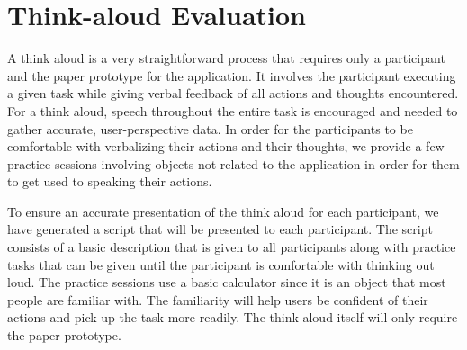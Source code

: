 \documentclass[pdftex,12pt,a4paper]{report}
\begin{document}
\chapter{Think-aloud Evaluation}
A think aloud is a very straightforward process that requires only a participant and the paper prototype for the application. It involves the participant executing a given task while giving verbal feedback of all actions and thoughts encountered. For a think aloud, speech throughout the entire task is encouraged and needed to gather accurate, user-perspective data. In order for the participants to be comfortable with verbalizing their actions and their thoughts, we provide a few practice sessions involving objects not related to the application in order for them to get used to speaking their actions.

To ensure an accurate presentation of the think aloud for each participant, we have generated a script that will be presented to each participant. The script consists of a basic description that is given to all participants along with practice tasks that can be given until the participant is comfortable with thinking out loud. The practice sessions use a basic calculator since it is an object that most people are familiar with. The familiarity will help users be confident of their actions and pick up the task more readily. The think aloud itself will only require the paper prototype.
\end{document}
